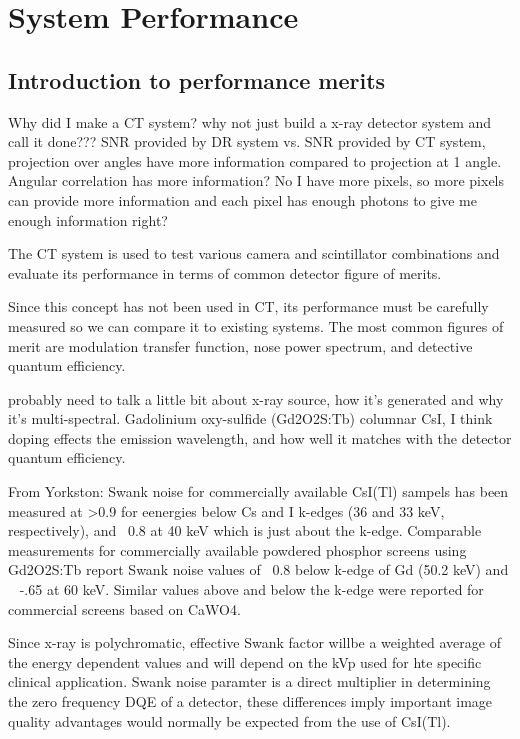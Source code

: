 \chapter{System Performance}
\section{Introduction to performance merits}
Why did I make a CT system?
why not just build a x-ray detector system and call it done???
SNR provided by DR system vs. SNR provided by CT system, projection over angles have more information compared to projection at 1 angle.  Angular correlation has more information?
No I have more pixels, so more pixels can provide more information and each pixel has enough photons to give me enough information right?


The CT system is used to test various camera and scintillator combinations and evaluate its performance in terms of common detector figure of merits.

Since this concept has not been used in CT, its performance must be carefully measured so we can compare it to existing systems.  The most common figures of merit are modulation transfer function, nose power spectrum, and detective quantum efficiency.

probably need to talk a little bit about x-ray source, how it's generated and why it's multi-spectral. 
Gadolinium oxy-sulfide (Gd2O2S:Tb)
columnar CsI, I think doping effects the emission wavelength, and how well it matches with the detector quantum efficiency.

From Yorkston:
Swank noise for commercially available CsI(Tl) sampels has been measured at >0.9 for eenergies below Cs and I k-edges (36 and 33 keV, respectively), and ~0.8 at 40 keV which is just about the k-edge.  Comparable measurements for commercially available powdered phosphor screens using Gd2O2S:Tb report Swank noise values of ~0.8 below k-edge of Gd (50.2 keV) and ~ -.65 at 60 keV.  Similar values above and below the k-edge were reported for commercial screens based on CaWO4.

Since x-ray is polychromatic, effective Swank factor willbe a weighted average of the energy dependent values and will depend on the kVp used for hte specific clinical application.   Swank noise paramter is a direct multiplier in determining the zero frequency DQE of a detector, these differences imply important image quality advantages would normally be expected from the use of CsI(Tl).

